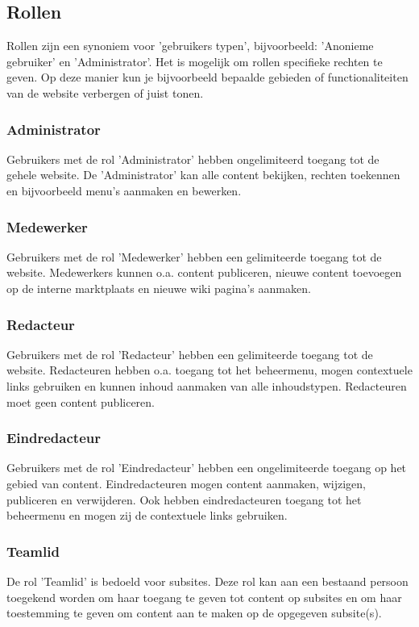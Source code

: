 \subsection{Rollen}\label{rollen}

Rollen zijn een synoniem voor 'gebruikers typen', bijvoorbeeld: 'Anonieme gebruiker' en 'Administrator'.  Het is mogelijk om rollen specifieke rechten te geven. Op deze manier kun je bijvoorbeeld bepaalde gebieden of functionaliteiten van de website verbergen of juist tonen. 

\subsubsection{Administrator}\label{administrator}
Gebruikers met de rol 'Administrator' hebben ongelimiteerd toegang tot de gehele website. De 'Administrator' kan alle content bekijken, rechten toekennen en bijvoorbeeld menu's aanmaken en bewerken.

\subsubsection{Medewerker}\label{medewerker}
Gebruikers met de rol 'Medewerker' hebben een gelimiteerde toegang tot de website. Medewerkers kunnen o.a. content publiceren, nieuwe content toevoegen op de interne marktplaats en nieuwe wiki pagina's aanmaken.

\subsubsection{Redacteur}\label{redacteur}
Gebruikers met de rol 'Redacteur' hebben een gelimiteerde toegang tot de website. Redacteuren hebben o.a. toegang tot het beheermenu, mogen contextuele links gebruiken en kunnen inhoud aanmaken van alle inhoudstypen. Redacteuren moet geen content publiceren.

\subsubsection{Eindredacteur}\label{eindredacteur}
Gebruikers met de rol 'Eindredacteur' hebben een ongelimiteerde toegang op het gebied van content. Eindredacteuren mogen content aanmaken, wijzigen, publiceren en verwijderen. Ook hebben eindredacteuren toegang tot het beheermenu en mogen zij de contextuele links gebruiken.

\subsubsection{Teamlid}\label{teamlid}
De rol 'Teamlid' is bedoeld voor subsites. Deze rol kan aan een bestaand persoon toegekend worden om haar toegang te geven tot content op subsites en om haar toestemming te geven om content aan te maken op de opgegeven subsite(s).